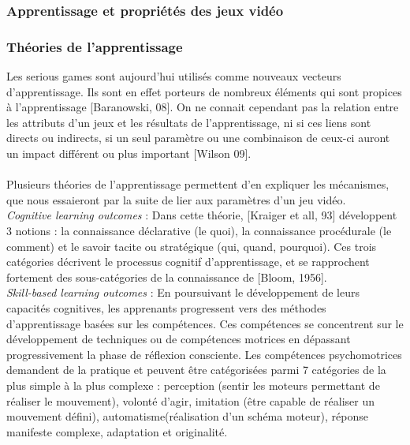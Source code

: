 	\subsubsection{Apprentissage et propriétés des jeux vidéo}
			\subsubsection*{Théories de l'apprentissage}
Les serious games sont aujourd'hui utilisés comme nouveaux vecteurs d'apprentissage. Ils sont en effet porteurs de nombreux éléments qui sont propices à l'apprentissage [Baranowski, 08]. On ne connait cependant pas la relation entre les attributs d'un jeux et les résultats de l'apprentissage, ni si ces liens sont directs ou indirects, si un seul paramètre ou une combinaison de ceux-ci auront un impact différent ou plus important [Wilson 09]\cite{Wils09}. 

\paragraph{}Plusieurs théories de l'apprentissage permettent d'en expliquer les mécanismes, que nous essaieront par la suite de lier aux paramètres d'un jeu vidéo.\\

\emph{Cognitive learning outcomes} :  Dans cette théorie, [Kraiger et all, 93] développent 3 notions : la connaissance déclarative (le quoi), la connaissance procédurale (le comment) et le savoir tacite ou stratégique (qui, quand, pourquoi). Ces trois catégories décrivent le processus cognitif d'apprentissage, et se rapprochent fortement des sous-catégories de la connaissance de [Bloom, 1956].\\ 

\emph{Skill-based learning outcomes} : En poursuivant le développement de leurs capacités cognitives, les apprenants progressent vers des méthodes d'apprentissage basées sur les compétences. Ces compétences se concentrent sur le développement de techniques ou de compétences motrices en dépassant progressivement la phase de réflexion consciente. Les compétences psychomotrices demandent de la pratique et peuvent être catégorisées parmi 7 catégories de la plus simple à la plus complexe : perception (sentir les moteurs permettant de réaliser le mouvement), volonté d'agir, imitation (être capable de réaliser un mouvement défini), automatisme(réalisation d'un schéma moteur), réponse manifeste complexe, adaptation et originalité.\\ 

